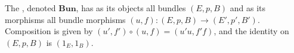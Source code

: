 The , denoted $\mathbf{Bun}$, has as its objects all bundles $(E, p, B)$ and as its morphisms all bundle morphisms $(u, f): (E, p, B) \to (E', p', B')$. Composition is given by $(u', f') \circ (u, f) = (u'u, f'f)$, and the identity on $(E, p, B)$ is $(1_E, 1_B)$.
